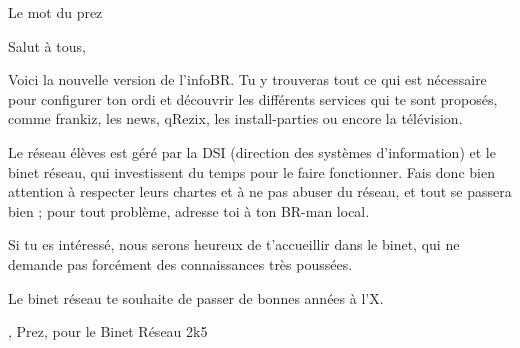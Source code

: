 \begin{center}
    { \LARGE Le mot du prez }
\end{center}

Salut \`a tous,

Voici la nouvelle version de l'infoBR. Tu y trouveras tout ce qui est n\'ecessaire pour configurer ton ordi et d\'ecouvrir
les diff\'erents services qui te sont propos\'es, comme frankiz, les news, qRezix, les install-parties ou encore la t\'el\'evision.

Le r\'eseau \'el\`eves est g\'er\'e par la DSI (direction des syst\`emes d'information) et le binet r\'eseau, qui investissent du temps pour le faire fonctionner.
Fais donc bien attention \`a respecter leurs chartes et \`a ne pas abuser du r\'eseau, et tout se passera bien ; pour tout probl\`eme, adresse toi \`a ton
BR-man local.

Si tu es int\'eress\'e, nous serons heureux de t'accueillir dans le binet, qui
ne demande pas forc\'ement des connaissances tr\`es pouss\'ees.

Le binet r\'eseau te souhaite de passer de bonnes ann\'ees \`a l'X.


\begin{flushright}
    , Prez, pour le Binet R\'eseau 2k5
\end{flushright}
